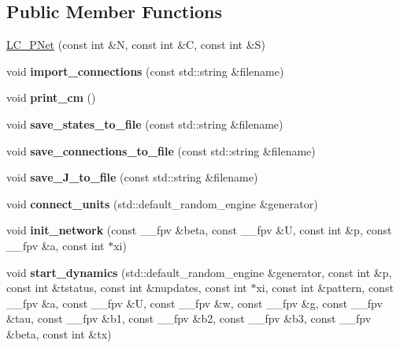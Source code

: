 \subsection*{Public Member Functions}
\begin{DoxyCompactItemize}
\item 
\hyperlink{classLC__PNet_a24f5b64eb7d135f812b05cfe747ddcc3}{L\+C\+\_\+\+P\+Net} (const int \&N, const int \&C, const int \&S)
\item 
void {\bfseries import\+\_\+connections} (const std\+::string \&filename)\hypertarget{classLC__PNet_a699f289ae423aa2af17139502654ab81}{}\label{classLC__PNet_a699f289ae423aa2af17139502654ab81}

\item 
void {\bfseries print\+\_\+cm} ()\hypertarget{classLC__PNet_afedba98cfd4a57742b963bf1fefdebed}{}\label{classLC__PNet_afedba98cfd4a57742b963bf1fefdebed}

\item 
void {\bfseries save\+\_\+states\+\_\+to\+\_\+file} (const std\+::string \&filename)\hypertarget{classLC__PNet_ac66589462b8882839a7a9849ce2025fa}{}\label{classLC__PNet_ac66589462b8882839a7a9849ce2025fa}

\item 
void {\bfseries save\+\_\+connections\+\_\+to\+\_\+file} (const std\+::string \&filename)\hypertarget{classLC__PNet_a1a66a51c4b649d64812d8c7eb49bda56}{}\label{classLC__PNet_a1a66a51c4b649d64812d8c7eb49bda56}

\item 
void {\bfseries save\+\_\+\+J\+\_\+to\+\_\+file} (const std\+::string \&filename)\hypertarget{classLC__PNet_afef840ecfc8b5b3a9180ca3c8e7f821f}{}\label{classLC__PNet_afef840ecfc8b5b3a9180ca3c8e7f821f}

\item 
void {\bfseries connect\+\_\+units} (std\+::default\+\_\+random\+\_\+engine \&generator)\hypertarget{classLC__PNet_ab9a618c5fc495ee199b420d0aa16758a}{}\label{classLC__PNet_ab9a618c5fc495ee199b420d0aa16758a}

\item 
void {\bfseries init\+\_\+network} (const \+\_\+\+\_\+fpv \&beta, const \+\_\+\+\_\+fpv \&U, const int \&p, const \+\_\+\+\_\+fpv \&a, const int $\ast$xi)\hypertarget{classLC__PNet_a0308d587505adab982a9e4322b8ac9ba}{}\label{classLC__PNet_a0308d587505adab982a9e4322b8ac9ba}

\item 
void {\bfseries start\+\_\+dynamics} (std\+::default\+\_\+random\+\_\+engine \&generator, const int \&p, const int \&tstatus, const int \&nupdates, const int $\ast$xi, const int \&pattern, const \+\_\+\+\_\+fpv \&a, const \+\_\+\+\_\+fpv \&U, const \+\_\+\+\_\+fpv \&w, const \+\_\+\+\_\+fpv \&g, const \+\_\+\+\_\+fpv \&tau, const \+\_\+\+\_\+fpv \&b1, const \+\_\+\+\_\+fpv \&b2, const \+\_\+\+\_\+fpv \&b3, const \+\_\+\+\_\+fpv \&beta, const int \&tx)\hypertarget{classLC__PNet_adadf57b63af5fc9238bb97df3b56381d}{}\label{classLC__PNet_adadf57b63af5fc9238bb97df3b56381d}

\end{DoxyCompactItemize}
